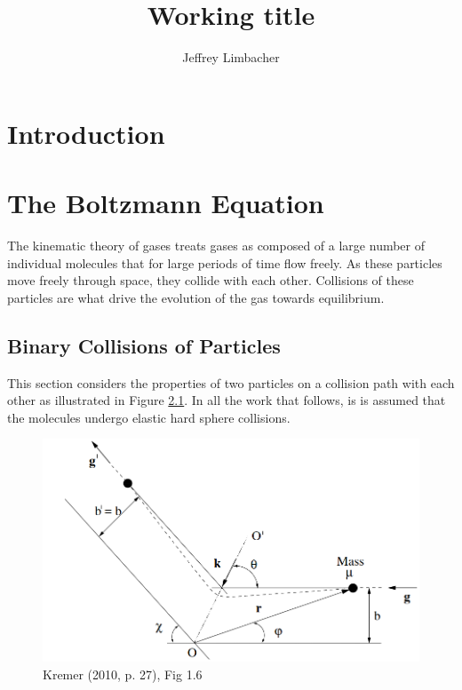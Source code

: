 \documentclass[12pt]{CSUNthesis}
\author{Jeffrey Limbacher}
\title{Working title}
\begin{document}
\doublespacing


\chapter{Introduction}
\label{Chap1}


\chapter{The Boltzmann Equation}
\label{Chap2}
	The kinematic theory of gases treats gases as composed of a large number of individual molecules that for large periods of time flow freely. As these particles move freely through space, they collide with each other. Collisions of these particles are what drive the evolution of the gas towards equilibrium. 
	
\section{Binary Collisions of Particles}
\label{sec:bincol}
	This section considers the properties of two particles on a collision path with each other as illustrated in Figure \ref{fig:binary_collision}. In all the work that follows, is is assumed that the molecules undergo elastic hard sphere collisions. 
\begin{figure}[h]
	\centering
	\includegraphics[scale=.5]{binary_collision}
	\caption{Kremer (2010, p. 27), Fig 1.6}
	\label{fig:binary_collision}
\end{figure}
	
\end{document}
